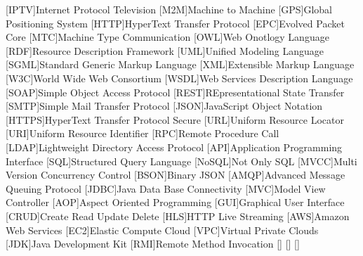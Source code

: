 \begin{acronym}
        [IPTV]{Internet Protocol Television}
        [M2M]{Machine to Machine}
        [GPS]{Global Positioning System}
        [HTTP]{HyperText Transfer Protocol}
        [EPC]{Evolved Packet Core}
        [MTC]{Machine Type Communication}
		[OWL]{Web Onotlogy Language}
		[RDF]{Resource Description Framework}
		[UML]{Unified Modeling Language}
		{Standard Generic Markup Language}
		[XML]{Extensible Markup Language}
		[W3C]{World Wide Web Consortium}
		{Web Services Description Language}
		{Simple Object Access Protocol}
		{REpresentational State Transfer}
		{Simple Mail Transfer Protocol}
		{JavaScript Object Notation}
		[HTTPS]{HyperText Transfer Protocol Secure}
		[URL]{Uniform Resource Locator}
		[URI]{Uniform Resource Identifier}
		[RPC]{Remote Procedure Call}
		{Lightweight Directory Access Protocol}
		[API]{Application Programming Interface}
		[SQL]{Structured Query Language}
		[NoSQL]{Not Only SQL}
		{Multi Version Concurrency Control}
		{Binary JSON}
		{Advanced Message Queuing Protocol}
		{Java Data Base Connectivity}
		[MVC]{Model View Controller}
		[AOP]{Aspect Oriented Programming}
		[GUI]{Graphical User Interface}
		{Create Read Update Delete}
		[HLS]{HTTP Live Streaming}
		[AWS]{Amazon Web Services}
		[EC2]{Elastic Compute Cloud}
		[VPC]{Virtual Private Clouds}
		[JDK]{Java Development Kit}
		[RMI]{Remote Method Invocation}
		\acro{}[]{}
		\acro{}[]{}
		\acro{}[]{}
\end{acronym}
